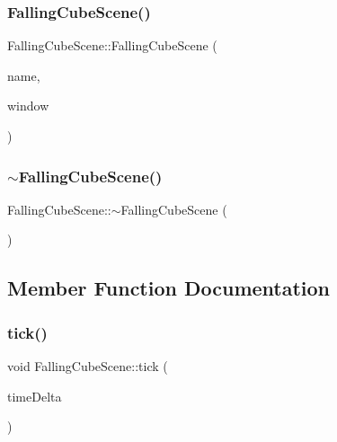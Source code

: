 \subsubsection{\texorpdfstring{Falling\+Cube\+Scene()}{FallingCubeScene()}}
{\footnotesize\ttfamily Falling\+Cube\+Scene\+::\+Falling\+Cube\+Scene (\begin{DoxyParamCaption}\item[{const std\+::string \&}]{name,  }\item[{\mbox{\hyperlink{class_simulation_window}{Simulation\+Window}} $\ast$}]{window }\end{DoxyParamCaption})\hspace{0.3cm}{\ttfamily [explicit]}}

\mbox{\label{class_falling_cube_scene_a36bf17afa0db6cbf678fa2b1741c2e67}} 
\subsubsection{\texorpdfstring{$\sim$\+Falling\+Cube\+Scene()}{~FallingCubeScene()}}
{\footnotesize\ttfamily Falling\+Cube\+Scene\+::$\sim$\+Falling\+Cube\+Scene (\begin{DoxyParamCaption}{ }\end{DoxyParamCaption})\hspace{0.3cm}{\ttfamily [default]}}



\subsection{Member Function Documentation}
\mbox{\label{class_falling_cube_scene_a4d077fc6767b5f5017a35d0433929c27}} 
\subsubsection{\texorpdfstring{tick()}{tick()}}
{\footnotesize\ttfamily void Falling\+Cube\+Scene\+::tick (\begin{DoxyParamCaption}\item[{float}]{time\+Delta }\end{DoxyParamCaption})\hspace{0.3cm}{\ttfamily [override]}}



